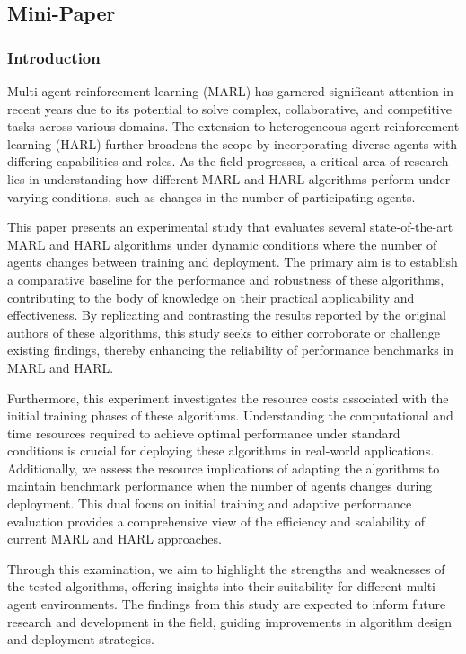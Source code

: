 \subsection*{Mini-Paper}

\subsubsection*{Introduction}

Multi-agent reinforcement learning (MARL) has garnered significant 
attention in recent years due to its potential to solve complex, 
collaborative, and competitive tasks across various domains. 
The extension to heterogeneous-agent reinforcement learning (HARL) 
further broadens the scope by incorporating diverse agents with 
differing capabilities and roles. As the field progresses, 
a critical area of research lies in understanding how different 
MARL and HARL algorithms perform under varying conditions, 
such as changes in the number of participating agents.

This paper presents an experimental study that evaluates several 
state-of-the-art MARL and HARL algorithms under dynamic conditions 
where the number of agents changes between training and deployment. 
The primary aim is to establish a comparative baseline for the 
performance and robustness of these algorithms, contributing to the 
body of knowledge on their practical applicability and effectiveness. 
By replicating and contrasting the results reported by the original 
authors of these algorithms, this study seeks to either corroborate or 
challenge existing findings, thereby enhancing the reliability of 
performance benchmarks in MARL and HARL.

Furthermore, this experiment investigates the resource costs 
associated with the initial training phases of these algorithms. 
Understanding the computational and time resources required to 
achieve optimal performance under standard conditions is crucial 
for deploying these algorithms in real-world applications. 
Additionally, we assess the resource implications of adapting the 
algorithms to maintain benchmark performance when the number of agents 
changes during deployment. This dual focus on initial training and 
adaptive performance evaluation provides a comprehensive view of the 
efficiency and scalability of current MARL and HARL approaches.

Through this examination, we aim to highlight the strengths and weaknesses 
of the tested algorithms, offering insights into their suitability for 
different multi-agent environments. The findings from this study are 
expected to inform future research and development in the field, 
guiding improvements in algorithm design and deployment strategies.

